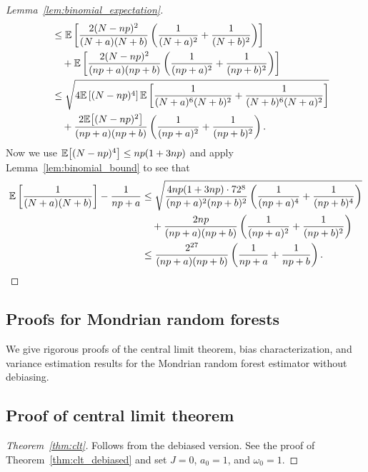 \begin{proof}[Lemma~\ref{lem:binomial_expectation}]
\begin{align*}
    &\quad\leq
    \mathbb{E} \left[
      \frac{2 (N - n p)^2}{(N+a)(N+b)}
      \left(
        \frac{1}{(N + a)^2}
        + \frac{1}{(N + b)^2}
      \right)
    \right] \\
    &\qquad+
    \mathbb{E} \left[
      \frac{2 (N - n p)^2}{(n p +a)(n p +b)}
      \left(
        \frac{1}{(n p + a)^2}
        + \frac{1}{(n p + b)^2}
      \right)
    \right] \\
    &\quad\leq
    \sqrt{
      4 \mathbb{E} \left[ (N - n p)^4 \right]
      \mathbb{E} \left[
        \frac{1}{(N + a)^6 (N+b)^2}
        + \frac{1}{(N + b)^6 (N+a)^2}
    \right]} \\
    &\qquad+
    \frac{2 \mathbb{E}\big[(N - n p)^2\big]}{(n p +a)(n p +b)}
    \left(
      \frac{1}{(n p + a)^2}
      + \frac{1}{(n p + b)^2}
    \right).
  \end{align*}
  Now we use
  $\mathbb{E}\big[(N - n p)^4\big] \leq n p(1+3n p)$
  and apply Lemma~\ref{lem:binomial_bound} to see that
  \begin{align*}
    \mathbb{E} \left[
      \frac{1}{(N+a)(N+b)}
    \right]
    - \frac{1}{n p+a}
    &\leq
    \sqrt{
      \frac{4n p (1 + 3n p) \cdot 72^8}{(n p + a)^2 (n p + b)^2}
      \left(
        \frac{1}{(n p + a)^4}
        + \frac{1}{(n p + b)^4}
    \right)} \\
    &\quad+
    \frac{2 n p}{(n p +a)(n p +b)}
    \left(
      \frac{1}{(n p + a)^2}
      + \frac{1}{(n p + b)^2}
    \right) \\
    &\leq
    \frac{2^{27}}{(n p + a) (n p + b)}
    \left(
      \frac{1}{n p + a}
      + \frac{1}{n p + b}
    \right).
  \end{align*}
\end{proof}

\subsection{Proofs for Mondrian random forests}

We give rigorous proofs of the central limit theorem,
bias characterization, and variance estimation
results for the Mondrian random forest estimator without debiasing.

\subsection*{Proof of central limit theorem}

\begin{proof}[Theorem~\ref{thm:clt}]
  Follows from the debiased version.
  See the proof of Theorem~\ref{thm:clt_debiased} and set $J=0$,
  $a_0 = 1$, and $\omega_0 = 1$.
\end{proof}


